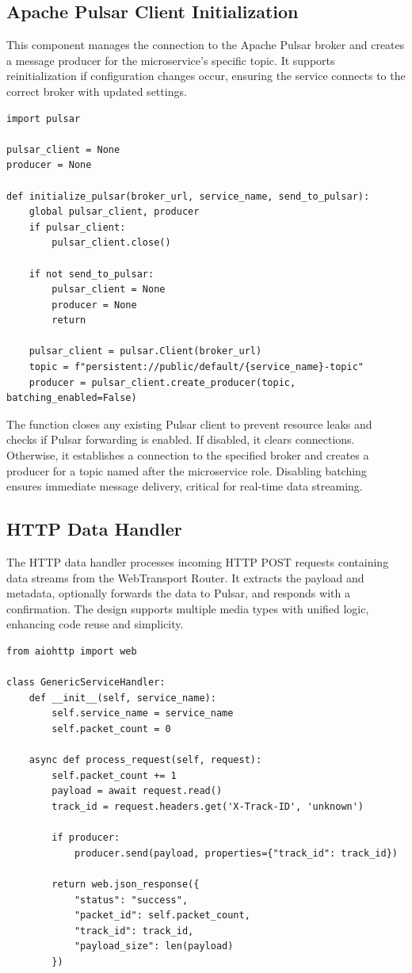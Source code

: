 \subsection{Apache Pulsar Client Initialization}
This component manages the connection to the Apache Pulsar broker and creates a message producer for the microservice’s specific topic. It supports reinitialization if configuration changes occur, ensuring the service connects to the correct broker with updated settings.

\begin{lstlisting}
import pulsar

pulsar_client = None
producer = None

def initialize_pulsar(broker_url, service_name, send_to_pulsar):
    global pulsar_client, producer
    if pulsar_client:
        pulsar_client.close()

    if not send_to_pulsar:
        pulsar_client = None
        producer = None
        return

    pulsar_client = pulsar.Client(broker_url)
    topic = f"persistent://public/default/{service_name}-topic"
    producer = pulsar_client.create_producer(topic, batching_enabled=False)
\end{lstlisting}

The function closes any existing Pulsar client to prevent resource leaks and checks if Pulsar forwarding is enabled. If disabled, it clears connections. Otherwise, it establishes a connection to the specified broker and creates a producer for a topic named after the microservice role. Disabling batching ensures immediate message delivery, critical for real-time data streaming.

\subsection{HTTP Data Handler}
The HTTP data handler processes incoming HTTP POST requests containing data streams from the WebTransport Router. It extracts the payload and metadata, optionally forwards the data to Pulsar, and responds with a confirmation. The design supports multiple media types with unified logic, enhancing code reuse and simplicity.

\begin{lstlisting}
from aiohttp import web

class GenericServiceHandler:
    def __init__(self, service_name):
        self.service_name = service_name
        self.packet_count = 0

    async def process_request(self, request):
        self.packet_count += 1
        payload = await request.read()
        track_id = request.headers.get('X-Track-ID', 'unknown')

        if producer:
            producer.send(payload, properties={"track_id": track_id})

        return web.json_response({
            "status": "success",
            "packet_id": self.packet_count,
            "track_id": track_id,
            "payload_size": len(payload)
        })
\end{lstlisting}

